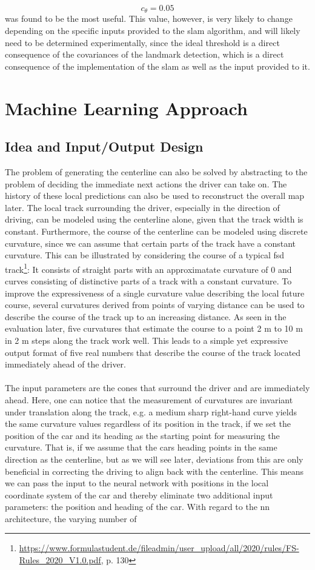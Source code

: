 $$c_\theta = 0.05$$
was found to be the most useful. This value, however, is very likely to change depending on the specific inputs provided to the \ac{slam} algorithm, and will likely need to be determined experimentally, since the ideal threshold is a direct consequence of the covariances of the landmark detection, which is a direct consequence of the implementation of the \ac{slam} as well as the input provided to it.


\section{Machine Learning Approach}
\subsection{Idea and Input/Output Design}
The problem of generating the centerline can also be solved by abstracting to the problem of deciding the immediate next actions the driver can take on. The history of these local predictions can also be used to reconstruct the overall map later. The local track surrounding the driver, especially in the direction of driving, can be modeled using the centerline alone, given that the track width is constant. Furthermore, the course of the centerline can be modeled using discrete curvature, since we can assume that certain parts of the track have a constant curvature. This can be illustrated by considering the course of a typical \ac{fsd} track\footnote{\url{https://www.formulastudent.de/fileadmin/user_upload/all/2020/rules/FS-Rules_2020_V1.0.pdf}, p. 130}: It consists of straight parts with an approximatate curvature of 0 and curves consisting of distinctive parts of a track with a constant curvature. To improve the expressiveness of a single curvature value describing the local future course, several curvatures derived from points of varying distance can be used to describe the course of the track up to an increasing distance. As seen in the evaluation later, five curvatures that estimate the course to a point 2 m to 10 m in 2 m steps along the track work well. This leads to a simple yet expressive output format of five real numbers that describe the course of the track located immediately ahead of the driver. \\\\The input parameters are the cones that surround the driver and are immediately ahead. Here, one can notice that the measurement of curvatures are invariant under translation along the track, e.g. a medium sharp right-hand curve yields the same curvature values regardless of its position in the track, if we set the position of the car and its heading as the starting point for measuring the curvature. That is, if we assume that the cars heading points in the same direction as the centerline, but as we will see later, deviations from this are only beneficial in correcting the driving to align back with the centerline. This means we can pass the input to the neural network with positions in the local coordinate system of the car and thereby eliminate two additional input parameters: the position and heading of the car. With regard to the \ac{nn} architecture, the varying number of 
